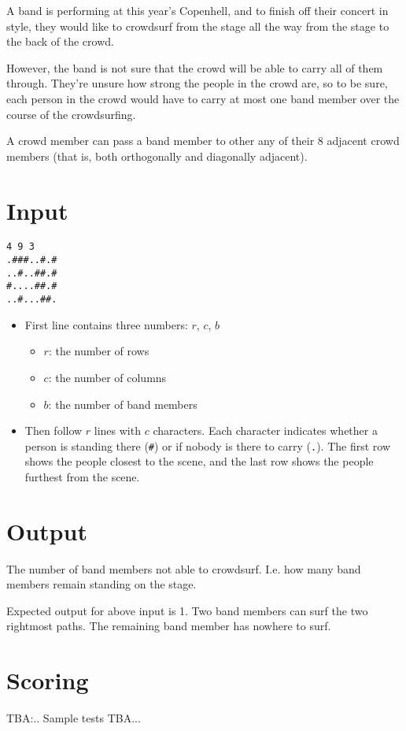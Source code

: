 
A band is performing at this year's Copenhell, and to finish off their concert in style, they would like to crowdsurf from the stage all the way from the stage to the back of the crowd.

However, the band is not sure that the crowd will be able to carry all of them through. They're unsure how strong the people in the crowd are, so to be sure, each person in the crowd would have to carry at most one band member over the course of the crowdsurfing.

A crowd member can pass a band member to other any of their 8 adjacent crowd members (that is, both orthogonally and diagonally adjacent).

\section*{Input}

\begin{verbatim}
4 9 3
.###..#.#
..#..##.#
#....##.#
..#...##.
\end{verbatim}

\begin{itemize}
  \item First line contains three numbers: $r$, $c$, $b$
    \begin{itemize}
      \item $r$: the number of rows
      \item $c$: the number of columns
      \item $b$: the number of band members
    \end{itemize}
  \item Then follow $r$ lines with $c$ characters. Each character indicates whether a person is standing there (\texttt{\#}) or if nobody is there to carry (\texttt{.}). The first row shows the people closest to the scene, and the last row shows the people furthest from the scene.
\end{itemize}

\section*{Output}

The number of band members not able to crowdsurf. I.e. how many band members remain standing on the stage.

Expected output for above input is 1. Two band members can surf the two rightmost paths. The remaining band member has nowhere to surf.

\section*{Scoring}

TBA:..
Sample tests TBA...
